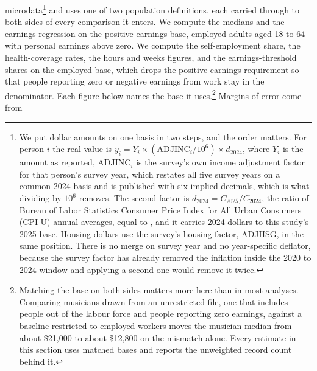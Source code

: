 microdata\footnote{We put dollar amounts on one basis in two steps, and the
order matters. For person \(i\) the real value is
\(y_i = Y_i \times (\mathrm{ADJINC}_i / 10^{6}) \times d_{2024}\), where \(Y_i\)
is the amount as reported, \(\mathrm{ADJINC}_i\) is the survey's own income
adjustment factor for that person's survey year, which restates all five
survey years on a common 2024 basis and is published with six implied
decimals, which is what dividing by \(10^{6}\) removes. The second factor is
\(d_{2024} = C_{2025}/C_{2024}\), the ratio of Bureau of Labor Statistics
Consumer Price Index for All Urban Consumers (CPI-U) annual averages, equal to
\NPumsDeflTwoZeroTwoFourToTwoZeroTwoFive, and it carries 2024 dollars to this
study's 2025 base. Housing dollars use the survey's housing factor, ADJHSG,
in the same position. There is no merge on survey year and no year-specific
deflator, because the survey factor has already removed the inflation inside
the 2020 to 2024 window and applying a second one would remove it twice.} and
uses one of two population definitions, each carried through to both sides of
every comparison it enters. We compute the medians and the earnings regression on
the positive-earnings base, employed adults aged 18 to 64 with personal
earnings above zero. We compute the self-employment share, the health-coverage
rates, the hours and weeks figures, and the earnings-threshold shares on the
employed base, which drops the positive-earnings requirement so that people
reporting zero or negative earnings from work stay in the denominator. Each
figure below names the base it uses.\footnote{Matching the base on both sides
matters more here than in most analyses. Comparing musicians drawn from an
unrestricted file, one that includes people out of the labour force and
people reporting zero earnings, against a baseline restricted to employed
workers moves the musician median from about \$21,000 to about \$12,800 on
the mismatch alone. Every estimate in this section uses matched bases and
reports the unweighted record count behind it.} Margins of error come from
